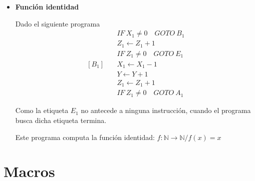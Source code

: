 \begin{itemize}
\begin{center}
\begin{tabular}{c c}
            &

            \begin{tabular}{c | c}
                $X_1$ & $Y$ \\
                \hline
                0 & 0 \\
            \end{tabular}
        \end{tabular}
        \end{center}

        Notemos que el programa nunca termina si entramos con una constante
        distinta de cero.

        Entonces este programa computa la función 
        $f: \mathbb{N} \to \mathbb{N} /
        f(x) = \begin{cases}
            \uparrow & x \neq 0 \\
            0 & x = 0
        \end{cases}$

        Donde $\uparrow$ significa que no está definida la función, es decir,
        el programa nunca termina.

    \item \textbf{Función identidad}

        Dado el siguiente programa
        \begin{align*}
            [A_1] \quad &IF ~ X_1 \neq 0 \quad GOTO ~ B_1 \\
                        &Z_1 \gets Z_1 + 1 \\
                        &IF ~ Z_1 \neq 0 \quad GOTO ~ E_1 \\
            [B_1] \quad &X_1 \gets X_1 - 1 \\
                        &Y \gets Y + 1 \\
                        &Z_1 \gets Z_1 + 1 \\
                        &IF ~ Z_1 \neq 0 \quad GOTO ~ A_1
        \end{align*}

        Como la etiqueta $E_1$ no antecede a ninguna instrucción, cuando el
        programa busca dicha etiqueta termina.

        Este programa computa la función identidad:
        $f: \mathbb{N} \to \mathbb{N} / f(x) = x$
\end{itemize}


\section{Macros}

